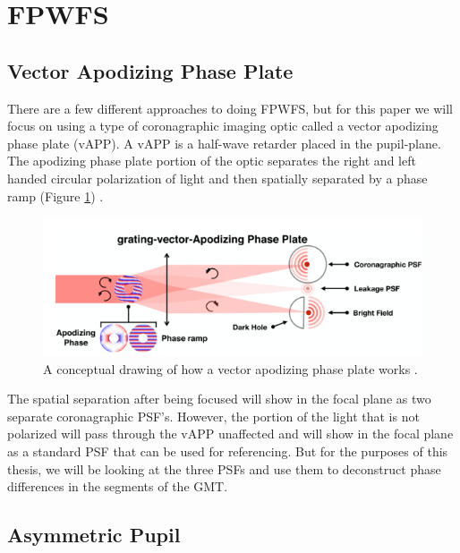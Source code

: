     

\section{FPWFS}
\label{sec:fpwfs}



\subsection{Vector Apodizing Phase Plate}
\label{sec:vAPP}

There are a few different approaches to doing FPWFS, but for this paper we will focus on using a type of coronagraphic imaging optic called a vector apodizing phase plate (vAPP).  A vAPP is a half-wave retarder placed in the pupil-plane.  The apodizing phase plate portion of the optic separates the right and left handed circular polarization of light and then spatially separated by a phase ramp (Figure \ref{fig:vapp_concept}) \cite{Bos2019Focal-planePlate}.



\begin{figure}[H]
\centering
\includegraphics[width=14 cm]{Figures/vAPP.png}
\caption{A conceptual drawing of how a vector apodizing phase plate works \cite{Bos2019Focal-planePlate}.}
\label{fig:vapp_concept}
\end{figure}

The spatial separation after being focused will show in the focal plane as two separate coronagraphic PSF's.  However, the portion of the light that is not polarized will pass through the vAPP unaffected and will show in the focal plane as a standard PSF that can be used for referencing.  But for the purposes of this thesis, we will be looking at the three PSFs and use them to deconstruct phase differences in the segments of the GMT.


\subsection{Asymmetric Pupil}
\label{sec:asym_pupil}

